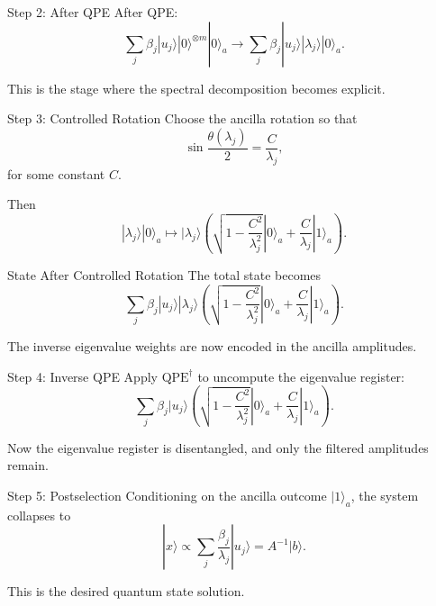 \documentclass{beamer}
\begin{document}

\begin{frame}{Step 2: After QPE}
After QPE:
\[
\sum_j \beta_j |u_j\rangle |0\rangle^{\otimes m}|0\rangle_a
\longrightarrow
\sum_j \beta_j |u_j\rangle |\lambda_j\rangle |0\rangle_a.
\]

This is the stage where the spectral decomposition becomes explicit.
\end{frame}


\begin{frame}{Step 3: Controlled Rotation}
Choose the ancilla rotation so that
\[
\sin\frac{\theta(\lambda_j)}{2} = \frac{C}{\lambda_j},
\]
for some constant \(C\).

Then
\[
|\lambda_j\rangle |0\rangle_a
\mapsto
|\lambda_j\rangle
\left(
\sqrt{1-\frac{C^2}{\lambda_j^2}}|0\rangle_a
+
\frac{C}{\lambda_j}|1\rangle_a
\right).
\]
\end{frame}


\begin{frame}{State After Controlled Rotation}
The total state becomes
\[
\sum_j \beta_j |u_j\rangle |\lambda_j\rangle
\left(
\sqrt{1-\frac{C^2}{\lambda_j^2}}|0\rangle_a
+
\frac{C}{\lambda_j}|1\rangle_a
\right).
\]

The inverse eigenvalue weights are now encoded in the ancilla amplitudes.
\end{frame}


\begin{frame}{Step 4: Inverse QPE}
Apply \( \text{QPE}^{\dagger} \) to uncompute the eigenvalue register:
\[
\sum_j \beta_j |u_j\rangle
\left(
\sqrt{1-\frac{C^2}{\lambda_j^2}}|0\rangle_a
+
\frac{C}{\lambda_j}|1\rangle_a
\right).
\]

Now the eigenvalue register is disentangled, and only the filtered amplitudes remain.
\end{frame}


\begin{frame}{Step 5: Postselection}
Conditioning on the ancilla outcome \(|1\rangle_a\), the system collapses to
\[
|x\rangle \propto \sum_j \frac{\beta_j}{\lambda_j}|u_j\rangle
= A^{-1}|b\rangle.
\]

This is the desired quantum state solution.
\end{frame}
\end{document}
